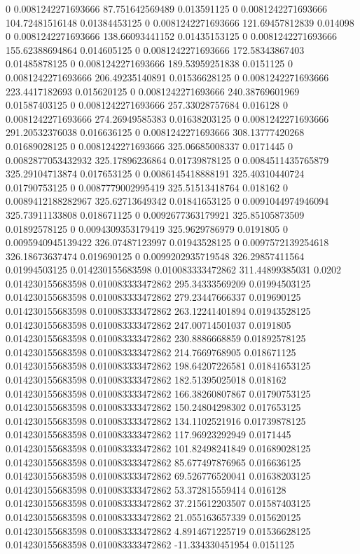 0 0.0081242271693666 87.751642569489 0.013591125
0 0.0081242271693666 104.72481516148 0.01384453125
0 0.0081242271693666 121.69457812839 0.014098
0 0.0081242271693666 138.66093441152 0.01435153125
0 0.0081242271693666 155.62388694864 0.014605125
0 0.0081242271693666 172.58343867403 0.01485878125
0 0.0081242271693666 189.53959251838 0.0151125
0 0.0081242271693666 206.49235140891 0.01536628125
0 0.0081242271693666 223.4417182693 0.015620125
0 0.0081242271693666 240.38769601969 0.01587403125
0 0.0081242271693666 257.33028757684 0.016128
0 0.0081242271693666 274.26949585383 0.01638203125
0 0.0081242271693666 291.20532376038 0.016636125
0 0.0081242271693666 308.13777420268 0.01689028125
0 0.0081242271693666 325.06685008337 0.0171445
0 0.0082877053432932 325.17896236864 0.01739878125
0 0.0084511435765879 325.29104713874 0.017653125
0 0.0086145418888191 325.40310440724 0.01790753125
0 0.0087779002995419 325.51513418764 0.018162
0 0.0089412188282967 325.62713649342 0.01841653125
0 0.0091044974946094 325.73911133808 0.018671125
0 0.0092677363179921 325.85105873509 0.01892578125
0 0.0094309353179419 325.9629786979 0.0191805
0 0.0095940945139422 326.07487123997 0.01943528125
0 0.0097572139254618 326.18673637474 0.019690125
0 0.0099202935719548 326.29857411564 0.01994503125
0.014230155683598 0.010083333472862 311.44899385031 0.0202
0.014230155683598 0.010083333472862 295.34333569209 0.01994503125
0.014230155683598 0.010083333472862 279.23447666337 0.019690125
0.014230155683598 0.010083333472862 263.12241401894 0.01943528125
0.014230155683598 0.010083333472862 247.00714501037 0.0191805
0.014230155683598 0.010083333472862 230.8886668859 0.01892578125
0.014230155683598 0.010083333472862 214.7669768905 0.018671125
0.014230155683598 0.010083333472862 198.64207226581 0.01841653125
0.014230155683598 0.010083333472862 182.51395025018 0.018162
0.014230155683598 0.010083333472862 166.38260807867 0.01790753125
0.014230155683598 0.010083333472862 150.24804298302 0.017653125
0.014230155683598 0.010083333472862 134.1102521916 0.01739878125
0.014230155683598 0.010083333472862 117.96923292949 0.0171445
0.014230155683598 0.010083333472862 101.82498241849 0.01689028125
0.014230155683598 0.010083333472862 85.677497876965 0.016636125
0.014230155683598 0.010083333472862 69.526776520041 0.01638203125
0.014230155683598 0.010083333472862 53.372815559414 0.016128
0.014230155683598 0.010083333472862 37.215612203507 0.01587403125
0.014230155683598 0.010083333472862 21.055163657339 0.015620125
0.014230155683598 0.010083333472862 4.8914671225719 0.01536628125
0.014230155683598 0.010083333472862 -11.334330451954 0.0151125
